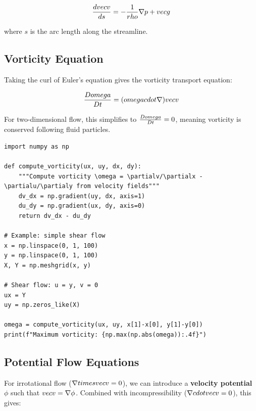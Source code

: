 \[
\frac{d\\vec{v}}{ds} = -\frac{1}{\\rho}\nabla p + \\vec{g}
\]

where $s$ is the arc length along the streamline.

\subsection{Vorticity Equation}

Taking the curl of Euler's equation gives the vorticity transport equation:

\[
\frac{D\\omega}{Dt} = (\\omega \\cdot \nabla)\\vec{v}
\]

For two-dimensional flow, this simplifies to $\frac{D\\omega}{Dt} = 0$, meaning vorticity is conserved following fluid particles.

\begin{lstlisting}[caption={Computing vorticity field}, label=lst:vorticity]
import numpy as np

def compute_vorticity(ux, uy, dx, dy):
    """Compute vorticity \omega = \partialv/\partialx - \partialu/\partialy from velocity fields"""
    dv_dx = np.gradient(uy, dx, axis=1)
    du_dy = np.gradient(ux, dy, axis=0)
    return dv_dx - du_dy

# Example: simple shear flow
x = np.linspace(0, 1, 100)
y = np.linspace(0, 1, 100)
X, Y = np.meshgrid(x, y)

# Shear flow: u = y, v = 0
ux = Y
uy = np.zeros_like(X)

omega = compute_vorticity(ux, uy, x[1]-x[0], y[1]-y[0])
print(f"Maximum vorticity: {np.max(np.abs(omega)):.4f}")
\end{lstlisting}

\subsection{Potential Flow Equations}

For irrotational flow ($\nabla \\times \\vec{v} = 0$), we can introduce a \textbf{velocity potential} $\phi$ such that $\\vec{v} = \nabla \phi$. Combined with incompressibility ($\nabla \\cdot \\vec{v} = 0$), this gives:

